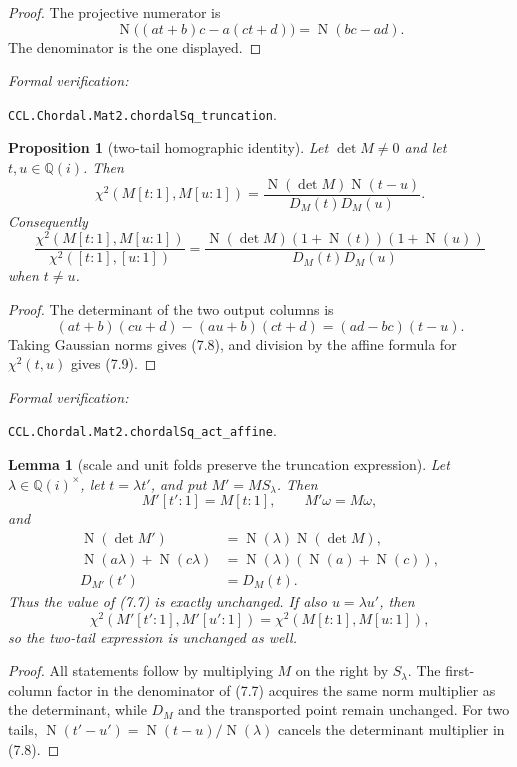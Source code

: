 \documentclass[10pt]{article}
\newtheorem{lemma}[theorem]{Lemma}
\newtheorem{proposition}[theorem]{Proposition}
\theoremstyle{definition}
\theoremstyle{remark}
\newcommand{\Qi}{\mathbb{Q}(i)}
\newcommand{\Norm}{\operatorname{N}}
\newcommand{\leanref}[1]{\par\smallskip\noindent
  \emph{Formal verification:}\par\nobreak
  {\raggedright\nolinkurl{#1}.\par}}
\newcommand{\Proj}[2]{[#1:#2]}
\begin{document}
\begin{proof}
The projective numerator is
\[
 \Norm\bigl((at+b)c-a(ct+d)\bigr)=\Norm(bc-ad).
\]
The denominator is the one displayed.
\end{proof}

\leanref{CCL.Chordal.Mat2.chordalSq_truncation}

\begin{proposition}[two-tail homographic identity]\label{prop:two-tail-projective-quadrance}
Let $\det M\ne0$ and let $t,u\in\Qi$.  Then
\[
 \chi^2\left(M\Proj{t}{1},M\Proj{u}{1}\right)
 =\frac{\Norm(\det M)\Norm(t-u)}{D_M(t)D_M(u)}.
\tag{7.8}
\]
Consequently
\[
 \frac{\chi^2\left(M\Proj{t}{1},M\Proj{u}{1}\right)}
 {\chi^2\left(\Proj{t}{1},\Proj{u}{1}\right)}
 =\frac{\Norm(\det M)(1+\Norm(t))(1+\Norm(u))}
 {D_M(t)D_M(u)}
\tag{7.9}
\]
when $t\ne u$.
\end{proposition}

\begin{proof}
The determinant of the two output columns is
\[
 (at+b)(cu+d)-(au+b)(ct+d)=(ad-bc)(t-u).
\]
Taking Gaussian norms gives (7.8), and division by the affine formula for $\chi^2(t,u)$ gives (7.9).
\end{proof}

\leanref{CCL.Chordal.Mat2.chordalSq_act_affine}

\begin{lemma}[scale and unit folds preserve the truncation expression]\label{lem:scale-fold-invariance}
Let $\lambda\in\Qi^\times$, let $t=\lambda t'$, and put $M'=MS_\lambda$.  Then
\[
 M'\Proj{t'}{1}=M\Proj{t}{1},
 \qquad
 M'\omega=M\omega,
\]
and
\[
 \begin{aligned}
 \Norm(\det M')&=\Norm(\lambda)\Norm(\det M),\\
 \Norm(a\lambda)+\Norm(c\lambda)
   &=\Norm(\lambda)(\Norm(a)+\Norm(c)),\\
 D_{M'}(t')&=D_M(t).
 \end{aligned}
\tag{7.10}
\]
Thus the value of (7.7) is exactly unchanged.  If also $u=\lambda u'$, then
\[
 \chi^2\left(M'\Proj{t'}{1},M'\Proj{u'}{1}\right)
 =\chi^2\left(M\Proj{t}{1},M\Proj{u}{1}\right),
\]
so the two-tail expression is unchanged as well.
\end{lemma}

\begin{proof}
All statements follow by multiplying $M$ on the right by $S_\lambda$.  The first-column factor in the denominator of (7.7) acquires the same norm multiplier as the determinant, while $D_M$ and the transported point remain unchanged.  For two tails, $\Norm(t'-u')=\Norm(t-u)/\Norm(\lambda)$ cancels the determinant multiplier in (7.8).
\end{proof}
\end{document}
